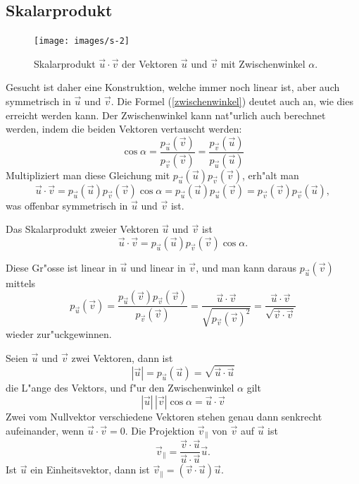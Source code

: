 \subsection{Skalarprodukt}
\begin{figure}
\begin{center}
\texttt{[image: images/s-2]}
\end{center}
\caption{Skalarprodukt $\vec u\cdot \vec v$ der Vektoren $\vec u$ und $\vec v$ mit Zwischenwinkel
$\alpha$.\label{image-skalarprodukt}}
\end{figure}
Gesucht ist daher eine Konstruktion, welche immer noch linear ist,
aber auch symmetrisch in $\vec u$ und $\vec v$.
Die Formel (\ref{zwischenwinkel}) deutet auch an, wie dies erreicht
werden kann. Der Zwischenwinkel kann nat"urlich auch berechnet werden,
indem die beiden Vektoren vertauscht werden:
\[
\cos \alpha
=
\frac{p_{\vec u}(\vec v)}{p_{\vec v}(\vec v)}
=
\frac{p_{\vec v}(\vec u)}{p_{\vec u}(\vec u)}
\]
Multipliziert man diese Gleichung mit 
$
p_{\vec u}(\vec u)
p_{\vec v}(\vec v)
$, erh"alt man
\[
\vec u\cdot\vec v
=
p_{\vec u}(\vec u)
p_{\vec v}(\vec v)
\cos\alpha =
p_{\vec u}(\vec u)p_{\vec u}(\vec v)
=
p_{\vec v}(\vec v)p_{\vec v}(\vec u),
\]
was offenbar symmetrisch in $\vec u$ und $\vec v$ ist.

\begin{definition}Das Skalarprodukt zweier Vektoren $\vec u$ und
$\vec v$ ist
\[
\vec u\cdot\vec v
=
p_{\vec u}(\vec u)
p_{\vec v}(\vec v)
\cos\alpha.
\]
\end{definition}
Diese Gr"osse ist linear in $\vec u$ und linear in $\vec v$, und man kann
daraus $p_{\vec u}(\vec v)$ mittels
\[
p_{\vec u}(\vec v)
=
\frac{p_{\vec u}(\vec v)p_{\vec v}(\vec v)}{p_{\vec v}(\vec v)}
=
\frac{\vec u\cdot\vec v}{\sqrt{p_{\vec v}(\vec v)^2}}
=
\frac{\vec u\cdot\vec v}{\sqrt{\vec v\cdot \vec v}}
\]
wieder zur"uckgewinnen.

\begin{satz}
Seien $\vec u$ und $\vec v$ zwei Vektoren, dann ist
\[
|\vec u|=p_{\vec u}(\vec u)=\sqrt{\vec u\cdot\vec u}
\]
die L"ange des Vektors, und f"ur den Zwischenwinkel $\alpha$ gilt
\[
|\vec u|\,|\vec v|\cos\alpha=\vec u\cdot\vec v
\]
Zwei vom Nullvektor verschiedene Vektoren  stehen genau dann senkrecht
aufeinander, wenn $\vec u\cdot\vec v=0$.
Die Projektion $\vec v_{\|}$ von $\vec v$ auf $\vec u$ ist
\[
\vec v_{\|}=\frac{\vec v\cdot\vec u}{\vec u\cdot\vec u}\vec u.
\]
Ist $\vec u$ ein Einheitsvektor, dann ist $\vec v_{\|}=(\vec v\cdot \vec u)\vec u$.
\end{satz}

